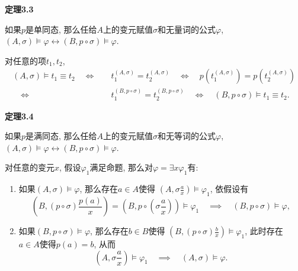 \documentclass[UTF8]{ctexart}
\begin{document}
\vspace{10pt}

\hypertarget{sec:定理3.3}{}
\noindent\textbf{定理3.3}

如果$p$是单同态, 那么任给$A$上的变元赋值$\sigma$和无量词的公式$\varphi$,
$(A,\sigma)\models\varphi\leftrightarrow(B,p\circ\sigma)\models\varphi$.


对任意的项$t_1,t_2$,
\begin{equation*}\begin{aligned}
    (A,\sigma)\models t_1\equiv t_2\quad\iff\quad&
    t_1^{(A,\sigma)}=t_2^{(A,\sigma)}\quad\iff\quad
    p(t_1^{(A,\sigma)})=p(t_2^{(A,\sigma)})\\[-3pt]\quad\iff\quad&
    t_1^{(B,p\circ\sigma)}=t_2^{(B,p\circ\sigma)}\quad\iff\quad
    (B,p\circ\sigma)\models t_1\equiv t_2.
\end{aligned}\tag*{\qedsymbol}\end{equation*}

\vspace{10pt}

\hypertarget{sec:定理3.4}{}
\noindent\textbf{定理3.4}

如果$p$是满同态, 那么任给$A$上的变元赋值$\sigma$和无等词的公式$\varphi$,
$(A,\sigma)\models\varphi\leftrightarrow(B,p\circ\sigma)\models\varphi$.


对任意的变元$x$, 假设$\varphi_1$满足命题, 那么对$\varphi=\exists x\varphi_1$有:
\begin{enumerate}
    \item 如果$(A,\sigma)\models\varphi$, 那么存在$a\in A$使得
    $\displaystyle\left(A,\sigma\frac{a}{x}\right)\models\varphi_1$, 依假设有
    \[
        \left(B,(p\circ\sigma)\frac{p(a)}{x}\right)=
        \left(B,p\circ\left(\sigma\frac{a}{x}\right)\right)\models\varphi_1
        \quad\implies\quad(B,p\circ\sigma)\models\varphi,
    \]
    \item 如果$(B,p\circ\sigma)\models\varphi$, 那么存在$b\in B$使得
    $\displaystyle\left(B,(p\circ\sigma)\frac{b}{x}\right)\models\varphi_1$,
    此时存在$a\in A$使得$p(a)=b$, 从而
    \begin{equation*}
        \left(A,\sigma\frac{a}{x}\right)\models\varphi_1
        \quad\implies\quad(A,\sigma)\models\varphi.
    \tag*{\qedsymbol}\end{equation*}
\end{enumerate}

\vspace{10pt}
\end{document}
